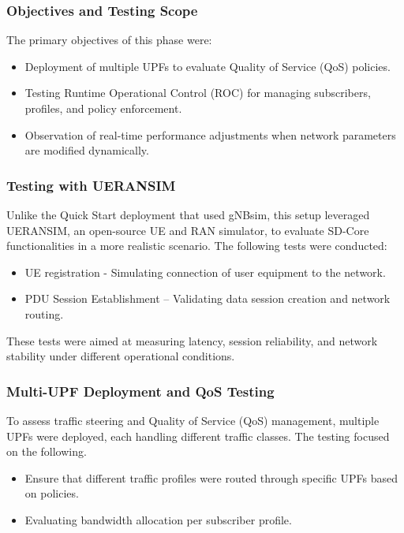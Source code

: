 \subsubsection{Objectives and Testing Scope}

The primary objectives of this phase were:
\begin{itemize}
    \item Deployment of multiple UPFs to evaluate Quality of Service (QoS) policies.
    \item Testing Runtime Operational Control (ROC) for managing subscribers, profiles, and policy enforcement.
    \item Observation of real-time performance adjustments when network parameters are modified dynamically.
\end{itemize}

\subsubsection{Testing with UERANSIM}

Unlike the Quick Start deployment that used gNBsim, this setup leveraged UERANSIM, an open-source UE and RAN simulator, to evaluate SD-Core functionalities in a more realistic scenario. The following tests were conducted:

\begin{itemize}
    \item UE registration - Simulating connection of user equipment to the network.
    \item PDU Session Establishment – Validating data session creation and network routing.
\end{itemize}

These tests were aimed at measuring latency, session reliability, and network stability under different operational conditions.

\subsubsection{Multi-UPF Deployment and QoS Testing}

To assess traffic steering and Quality of Service (QoS) management, multiple UPFs were deployed, each handling different traffic classes. The testing focused on the following.

\begin{itemize}
    \item Ensure that different traffic profiles were routed through specific UPFs based on policies.
    \item Evaluating bandwidth allocation per subscriber profile.
\end{itemize}

